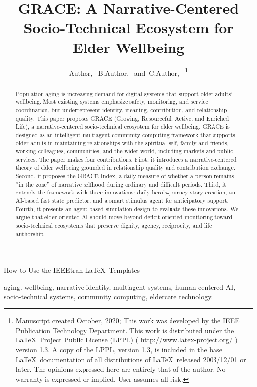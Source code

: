 
\title{GRACE: A Narrative-Centered Socio-Technical Ecosystem for Elder Wellbeing}
\author{Author,~
        B.Author,~
        and~C.Author,~%
\thanks{Manuscript created October, 2020; This work was developed by the IEEE Publication Technology Department. This work is distributed under the \LaTeX \ Project Public License (LPPL) ( http://www.latex-project.org/ ) version 1.3. A copy of the LPPL, version 1.3, is included in the base \LaTeX \ documentation of all distributions of \LaTeX \ released 2003/12/01 or later. The opinions expressed here are entirely that of the author. No warranty is expressed or implied. User assumes all risk.}}

%
{How to Use the IEEEtran \LaTeX \ Templates}

\maketitle
\begin{abstract}
Population aging is increasing demand for digital systems that support older adults’ wellbeing. Most existing systems emphasize safety, monitoring, and service coordination, but underrepresent identity, meaning, contribution, and relationship quality. This paper proposes GRACE (Growing, Resourceful, Active, and Enriched Life), a narrative-centered socio-technical ecosystem for elder wellbeing. GRACE is designed as an intelligent multiagent community computing framework that supports older adults in maintaining relationships with the spiritual self, family and friends, working colleagues, communities, and the wider world, including markets and public services. The paper makes four contributions. First, it introduces a narrative-centered theory of elder wellbeing grounded in relationship quality and contribution exchange. Second, it proposes the GRACE Index, a daily measure of whether a person remains “in the zone” of narrative selfhood during ordinary and difficult periods. Third, it extends the framework with three innovations: daily hero’s-journey story creation, an AI-based fast state predictor, and a smart stimulus agent for anticipatory support. Fourth, it presents an agent-based simulation design to evaluate these innovations. We argue that elder-oriented AI should move beyond deficit-oriented monitoring toward socio-technical ecosystems that preserve dignity, agency, reciprocity, and life authorship.
\end{abstract}

\begin{IEEEkeywords}
aging, wellbeing, narrative identity, multiagent systems, human-centered AI, socio-technical systems, community computing, eldercare technology.
\end{IEEEkeywords}